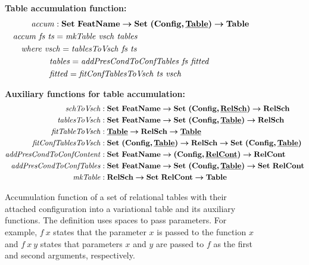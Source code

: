 \begin{figure}

\textbf{Table accumulation function:}
\begin{alignat*}{1}
\mathit{accum} &: \settype \fSet \totype \settype {\typepair \confSet \pTabSet} \totype \tabletype\\
\mathit{accum} \  \mathit{fs} \ \mathit{ts} &= \mathit{mkTable} \ \mathit{vsch} \ \mathit{tables}\\
&\hspace{-40pt}\textit{where }
\mathit{vsch} = \mathit{tablesToVsch} \ \mathit{fs} \ \mathit{ts}\\
&\hspace{-6pt} \mathit{tables} = \mathit{addPresCondToConfTables} \ \mathit{fs} \ \mathit {fitted}\\
&\hspace{-6pt} \mathit{fitted} = \mathit{fitConfTablesToVsch} \ \mathit{ts} \ \mathit{vsch}
\end{alignat*}


\medskip 
\textbf{Auxiliary functions for table accumulation:}
\footnotesize
\begin{alignat*}{1}
\mathit{schToVsch} &: \settype \fSet \totype \settype {\typepair \confSet \pRelSchSet} \totype \vRelSchSet\\
\mathit{tablesToVsch} &: \settype \fSet \totype \settype {\typepair \confSet \pTabSet} \totype \vRelSchSet\\
\mathit{fitTableToVsch} &: \pTabSet \totype \vRelSchSet \totype \pTabSet\\
\mathit{fitConfTablesToVsch} &: \settype {\typepair \confSet \pTabSet} \totype \vRelSchSet \totype \settype {\typepair \confSet \pTabSet}\\
\mathit{addPresCondToConfContent} &: \settype \fSet \totype \typepair \confSet \pRelContSet \totype \vRelContSet\\
\mathit{addPresCondToConfTables} &: \settype \fSet \totype \settype {\typepair \confSet \pTabSet} \totype \settype \vRelContSet\\
\mathit{mkTable} &: \vRelSchSet \totype \settype \vRelContSet \totype \tabletype
\end{alignat*}


\caption[Accumulation function of a set of relational tables with their attached configuration into a variational table]{Accumulation function of a set of relational tables with their attached configuration into a variational table and its auxiliary functions. The definition uses spaces to pass parameters. For example, $f \ x$ states that the parameter $x$ is passed to the function $x$ and $f\ x\ y$ states that
parameters $x$ and $y$ are passed to $f$ as the first and second arguments, respectively.
}
\label{fig:accum1}
\end{figure}

